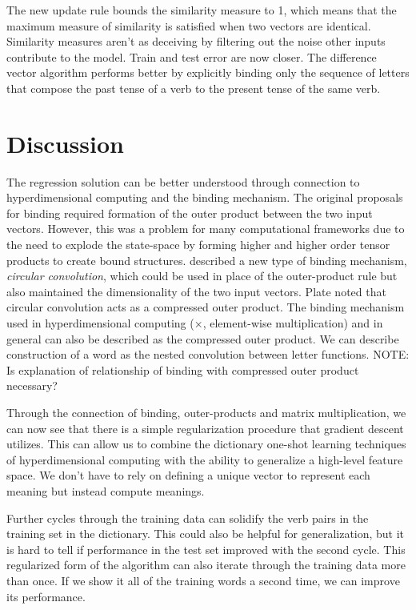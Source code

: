\documentclass{article}
\begin{document}
The new update rule bounds the similarity measure to 1, which means that the maximum measure of similarity is satisfied when two vectors are identical. Similarity measures aren't as deceiving by filtering out the noise other inputs contribute to the model. Train and test error are now closer. The difference vector algorithm performs better by explicitly binding only the sequence of letters that compose the past tense of a verb to the present tense of the same verb. 


\section{Discussion}
The regression solution can be better understood through connection to hyperdimensional computing and the binding mechanism. The original proposals for binding \citet{Smolensky1990} required formation of the outer product between the two input vectors. However, this was a problem for many computational frameworks due to the need to explode the state-space by forming higher and higher order tensor products to create bound structures. \citet{Plate1991} described a new type of binding mechanism, \emph{circular convolution}, which could be used in place of the outer-product rule but also maintained the dimensionality of the two input vectors. Plate noted that circular convolution acts as a compressed outer product. The binding mechanism used in hyperdimensional computing ($\times$, element-wise multiplication) and in general can also be described as the compressed outer product. We can describe construction of a word as the nested convolution between letter functions.
NOTE: Is explanation of relationship of binding with compressed outer product necessary? 


Through the connection of binding, outer-products and matrix multiplication, we can now see that there is a simple regularization procedure that gradient descent utilizes. This can allow us to combine the dictionary one-shot learning techniques of hyperdimensional computing with the ability to generalize a high-level feature space. We don't have to rely on defining a unique vector to represent each meaning but instead compute meanings. 

Further cycles through the training data can solidify the verb pairs in the training set in the dictionary. This could also be helpful for generalization, but it is hard to tell if performance in the test set improved with the second cycle.  This regularized form of the algorithm can also iterate through the training data more than once. If we show it all of the training words a second time, we can improve its performance.
\end{document}
